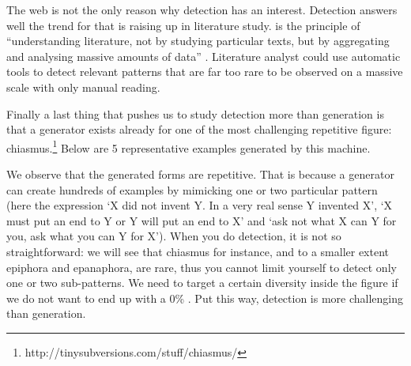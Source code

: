The web is not the only reason why detection has an interest. Detection answers well the  trend for  that is raising up in literature study.  is the principle of ``understanding literature, not by studying particular texts, but by aggregating and analysing massive amounts of data'' \citep{Schulz2011}. %
Literature analyst could use automatic tools to detect relevant patterns that are far too rare to be observed on a massive scale with only manual reading.

Finally a last thing that pushes us to study detection more than generation is that a generator exists already for one of the most challenging repetitive figure: chiasmus.\footnote{http://tinysubversions.com/stuff/chiasmus/}
Below are 5 representative examples generated by this machine.

%
%
%
%
%
 
  We observe that the generated forms are repetitive. That is because a generator can create hundreds of examples by mimicking one or two particular pattern (here the expression `X did not invent Y. In a very real sense Y invented X', `X must put an end to Y or Y will put an end to X' and `ask not what X can Y for you, ask what you can Y for X'). When you do detection, it is not so straightforward: we will see that chiasmus for instance, and to a smaller extent epiphora and epanaphora, are rare, thus you cannot limit yourself to detect only one or two sub-patterns. We need to target a certain diversity inside the figure if we do not want to end up with a 0\% . Put this way, detection is more challenging than generation.

